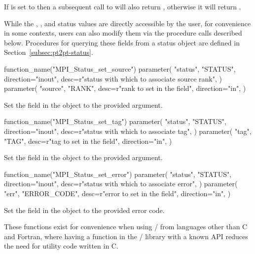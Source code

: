 If  is set to  then a subsequent call to 
 will also return ,
otherwise it will return 
.  


While the , , and 
status values are directly accessible by the user,
for convenience in some contexts, users can also
modify them via the procedure calls described below.
Procedures for querying these fields from a
status object are defined in Section~\ref{subsec:pt2pt-status}.


%
\begin{mpi-binding}
    function_name("MPI_Status_set_source")
    parameter(
        "status",
        "STATUS",
        direction="inout",
        desc=r"status with which to associate source rank",
    )
    parameter(
        "source",
        "RANK",
        desc=r"rank to set in the  field",
        direction="in",
    )
\end{mpi-binding}

Set the  field in the  object to the provided  argument.

%
\begin{mpi-binding}
    function_name("MPI_Status_set_tag")
    parameter(
        "status",
        "STATUS",
        direction="inout",
        desc=r"status with which to associate tag",
    )
    parameter(
        "tag",
        "TAG",
        desc=r"tag to set in the  field",
        direction="in",
    )
\end{mpi-binding}

Set the  field in the  object to the provided  argument.

%
\begin{mpi-binding}
    function_name("MPI_Status_set_error")
    parameter(
        "status",
        "STATUS",
        direction="inout",
        desc=r"status with which to associate error",
    )
    parameter(
        "err",
        "ERROR_CODE",
        desc=r"error to set in the  field",
        direction="in",
    )
\end{mpi-binding}

Set the  field in the  object to the provided  error code.

\begin{rationale}
These functions exist for convenience when using \mpi/ from languages
other than C and Fortran, where having a function in the \mpi/ library
with a known API reduces the need for utility code written in C.
\end{rationale}

